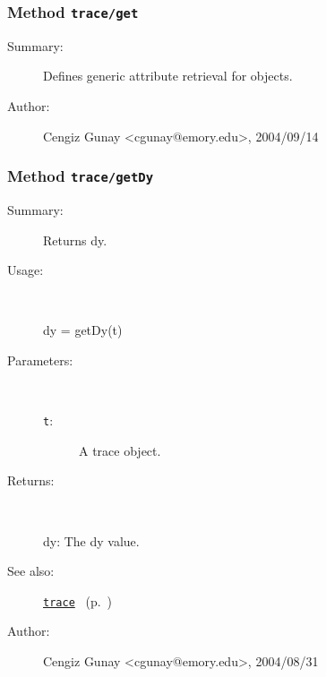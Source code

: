 \subsubsection[Method \texttt{get}]{Method \texttt{trace/get}}%
%
\label{ref_trace__get}%
\hypertarget{ref_trace__get}{}%
\begin{description}
\item[Summary:]Defines generic attribute retrieval for objects.
%
%
%
%
%
%
%
\item[Author:]%
Cengiz Gunay <cgunay@emory.edu>, 2004/09/14
%
\end{description}
\methodline%
\subsubsection[Method \texttt{getDy}]{Method \texttt{trace/getDy}}%
%
\label{ref_trace__getDy}%
\hypertarget{ref_trace__getDy}{}%
\begin{description}
\item[Summary:]Returns dy.
%
\item[Usage:]~%
\begin{lyxcode}%
dy = getDy(t)
%
\end{lyxcode}%
%
%
\item[Parameters:]~
\begin{description}%
\item[\texttt{t}:]
 A trace object.
\end{description}%
%
\item[Returns:
]~

	dy: The dy value.
%
%
\item[See also:]%
\hyperlink{ref_trace}{\texttt{trace}}%
\ (p.~\pageref{ref_trace})%
%
%
\item[Author:]%
Cengiz Gunay <cgunay@emory.edu>, 2004/08/31
%
\end{description}
\methodline%
